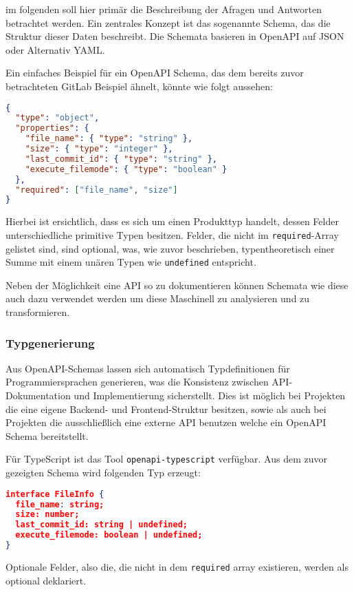 im folgenden soll hier primär die Beschreibung der Afragen und Antworten betrachtet werden.
Ein zentrales Konzept ist das sogenannte Schema, das die Struktur dieser Daten beschreibt. 
Die Schemata basieren in OpenAPI auf JSON oder Alternativ YAML.\cite{OpenApiSpec}

Ein einfaches Beispiel für ein OpenAPI Schema, das dem bereits zuvor betrachteten GitLab Beispiel ähnelt, könnte wie folgt aussehen:

\begin{lstlisting}[language=json]
{
  "type": "object",
  "properties": {
    "file_name": { "type": "string" },
    "size": { "type": "integer" },
    "last_commit_id": { "type": "string" },
    "execute_filemode": { "type": "boolean" }
  },
  "required": ["file_name", "size"]
}
\end{lstlisting}\cite{OpenApiSpec}

Hierbei ist ersichtlich, dass es sich um einen Produkttyp handelt,
dessen Felder unterschiedliche primitive Typen besitzen.
Felder, die nicht im \texttt{required}-Array gelistet sind, sind optional, was, wie zuvor beschrieben,
typentheoretisch einer Summe mit einem unären Typen wie \texttt{undefined} entspricht.

Neben der Möglichkeit eine API so zu dokumentieren können Schemata wie diese auch dazu verwendet werden
um diese Maschinell zu analysieren und zu transformieren.

\subsubsection{Typgenerierung}

Aus OpenAPI-Schemas lassen sich automatisch Typdefinitionen für Programmiersprachen generieren, 
was die Konsistenz zwischen API-Dokumentation und Implementierung sicherstellt.
Dies ist möglich bei Projekten die eine eigene Backend- und Frontend-Struktur besitzen, sowie als auch
bei Projekten die ausschließlich eine externe API benutzen welche ein OpenAPI Schema bereitstellt.\cite{OpenAPITypeScript}

Für TypeScript ist das Tool \texttt{openapi-typescript} verfügbar.
Aus dem zuvor gezeigten Schema wird folgenden Typ erzeugt:
\begin{lstlisting}[language=json]
interface FileInfo {
  file_name: string;
  size: number;
  last_commit_id: string | undefined;
  execute_filemode: boolean | undefined;
}
\end{lstlisting}
Optionale Felder, also die, die nicht in dem \texttt{required} array existieren, werden als optional deklariert.

